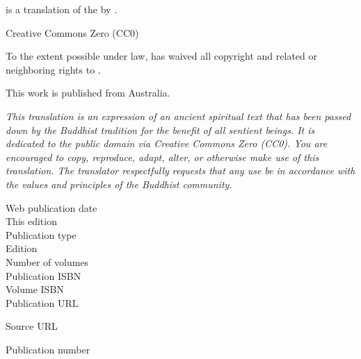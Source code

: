 
\begin{footnotesize}

\textit{} is a translation of the  by .

\medskip

Creative Commons Zero (CC0)

To the extent possible under law,  has waived all copyright and related or neighboring rights to \textit{}.

\medskip

This work is published from Australia.

\begin{center}
\textit{This translation is an expression of an ancient spiritual text that has been passed down by the Buddhist tradition for the benefit of all sentient beings. It is dedicated to the public domain via Creative Commons Zero (CC0). You are encouraged to copy, reproduce, adapt, alter, or otherwise make use of this translation. The translator respectfully requests that any use be in accordance with the values and principles of the Buddhist community.}
\end{center}

\medskip

\begin{description}
    \item[Web publication date] 
    \item[This edition] 
    \item[Publication type] 
    \item[Edition] 
    \item[Number of volumes] 
    \item[Publication ISBN] 
    \item[Volume ISBN] 
    \item[Publication URL] \href{\VAR{publication_url | safe}}{}
    \item[Source URL] \href{\VAR{source_url | safe}}{}
    \item[Publication number] 
\end{description}

\medskip


\end{footnotesize}
